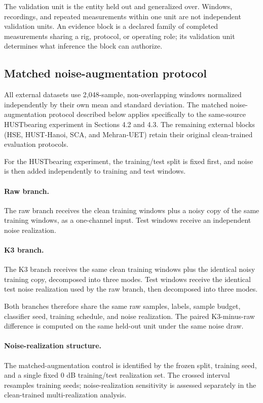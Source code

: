 \documentclass[11pt]{article}
\begin{document}
The validation unit is the entity held out and generalized over. Windows,
recordings, and repeated measurements within one unit are not independent
validation units. An evidence block is a declared family of completed
measurements sharing a rig, protocol, or operating role; its validation unit
determines what inference the block can authorize.

\subsection{Matched noise-augmentation protocol}

All external datasets use 2,048-sample, non-overlapping windows normalized
independently by their own mean and standard deviation. The matched
noise-augmentation protocol described below applies specifically to the
same-source HUSTbearing experiment in Sections 4.2 and 4.3. The remaining
external blocks (HSE, HUST-Hanoi, SCA, and Mehran-UET) retain their original
clean-trained evaluation protocols.

For the HUSTbearing experiment, the training/test split is fixed first, and
noise is then added independently to training and test windows.

\paragraph{Raw branch.}
The raw branch receives the clean training windows plus a noisy copy of the
same training windows, as a one-channel input. Test windows receive an
independent noise realization.

\paragraph{K3 branch.}
The K3 branch receives the same clean training windows plus the identical noisy
training copy, decomposed into three modes. Test windows receive the identical
test noise realization used by the raw branch, then decomposed into three
modes.

Both branches therefore share the same raw samples, labels, sample budget,
classifier seed, training schedule, and noise realization. The paired
K3-minus-raw difference is computed on the same held-out unit under the same
noise draw.

\paragraph{Noise-realization structure.}
The matched-augmentation control is identified by the frozen split, training
seed, and a single fixed 0 dB training/test realization set. The crossed
interval resamples training seeds; noise-realization sensitivity is assessed
separately in the clean-trained multi-realization analysis.
\end{document}
